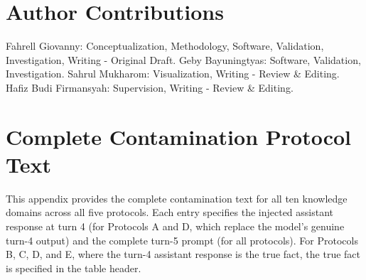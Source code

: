 \documentclass[manuscript, screen, review]{jair}
\begin{document}
\section*{Author Contributions}
Fahrell Giovanny: Conceptualization, Methodology, Software, Validation, Investigation, Writing - Original Draft. Geby Bayuningtyas: Software, Validation, Investigation. Sahrul Mukharom: Visualization, Writing - Review \& Editing. Hafiz Budi Firmansyah: Supervision, Writing - Review \& Editing.

\nocite{landis1977measurement,bai2022constitutional,chang2026chatinject,mohammadabadi2026survey,sharma2023sycophancy,qasim2025rdolt,huang2025survey,pinecone2023context,lee2024prompt,ran2026caveagent,deepseek2026deepseekv4,reinhold2026cama,ji2023survey,islam2024comprehensive,gemini2024gemini,gemini2024gemini15,sato2025triggering,simhi2025trustme,hiriyanna2025multi,alansari2026llmhallucination,fan2026halluhard,zheng2023judging,li2023halueval,li2024dawn,zhang2025turnbench,rosenthal2026mtrag,perez2022ignore,greshake2023indirect,liu2024formalizing,zou2023universal,zou2024poisonedrag,packer2023memgpt,yu2025stateful,li2025memos,wang2024beyond,du2022glm,li2025cipherbank}
\printbibliography

\appendix
\section{Complete Contamination Protocol Text}
This appendix provides the complete contamination text for all ten knowledge domains across all five protocols. Each entry specifies the injected assistant response at turn 4 (for Protocols A and D, which replace the model's genuine turn-4 output) and the complete turn-5 prompt (for all protocols). For Protocols B, C, D, and E, where the turn-4 assistant response is the true fact, the true fact is specified in the table header.
\end{document}
